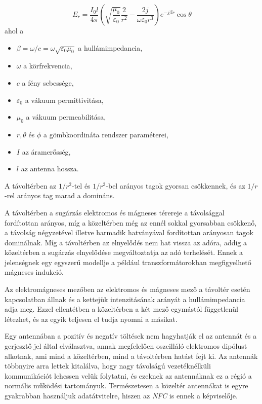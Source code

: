 \documentclass[12pt]{article}
\begin{document}
\begin{equation}
E_{r} = \frac{I_0 l}{4 \pi}
\left( \sqrt{\frac{\mu_0}{\varepsilon_0}} \frac{2}{r^2}
- \frac{2j}{\omega \varepsilon_0 r^3}\right)
e^{-j\beta r} \cos \theta
\end{equation}
ahol a 
\begin{itemize}
\item $\beta = \omega /c = \omega \sqrt{\varepsilon_0 \mu_0}$ a hullámimpedancia,
\item $\omega$ a körfrekvencia,
\item $c$ a fény sebessége,
\item $\varepsilon_0$ a vákuum permittivitása,
\item $\mu_0$ a vákuum permeabilitása,
\item $r, \theta$ és  $\phi$ a gömbkoordináta rendszer paraméterei,
\item $I$ az áramerősség,
\item $l$ az antenna hossza.
\end{itemize} 

A távoltérben az ${1}/{r^2}$-tel és ${1}/{r^3}$-bel arányos tagok
gyorsan csökkennek, és az ${1}/{r}$-rel arányos tag marad a domináns.

A távoltérben a sugárzás elektromos és mágneses térereje a 
távolsággal fordítottan arányos, 
míg a közeltérben még az ennél sokkal gyorsabban csökkenő, a távolság négyzetével illetve 
harmadik hatványával fordítottan arányosan tagok dominálnak.
Míg a távoltérben az elnyelődés nem hat vissza az adóra, addig a közeltérben a sugárzás
elnyelődése megváltoztatja az adó terhelését. Ennek a jelenségnek egy egyszerű
modellje a például transzformátorokban megfigyelhető mágneses indukció.

Az elektromágneses mezőben az elektromos és mágneses mező a távoltér esetén kapcsolatban
állnak és a kettejük intenzitásának arányát a hullámimpedancia adja meg. 
Ezzel ellentétben a közeltérben a két mező egymástól függetlenül létezhet, és
az egyik teljesen el tudja nyomni a másikat.

Egy antennában a pozitív és negatív töltések nem hagyhatják el az antennát és a 
gerjesztő jel által elválasztva, annak megfelelően oszcilláló elektromos dipólust
alkotnak, ami mind a közeltérben, mind a távoltérben hatást fejt ki. Az antennák
többnyire arra lettek kitalálva, hogy nagy távolságú vezetéknélküli kommunikációt
lehessen velük folytatni, és ezeknek az antennáknak ez a régió a normális működési
tartományuk. Természetesen a közeltér antennákat is egyre gyakrabban használjuk
adatátvitelre, hiszen az \emph{NFC} is ennek a képviselője.
\end{document}
